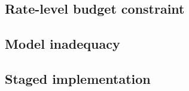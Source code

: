 \documentclass[11pt]{article}
\begin{document}
\subsection{Rate-level budget constraint}
\label{sec:budget}
%
%
%
%
%

\subsection{Model inadequacy}
\label{sec:inadequacy}
%
%
%
%
%

\subsection{Staged implementation}
\label{sec:staged}
%
%
%
%
\end{document}
